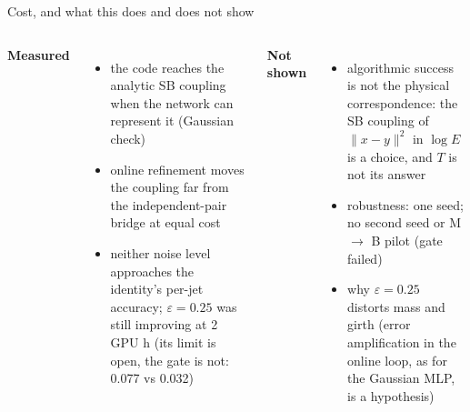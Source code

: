 \begin{frame}{Cost, and what this does and does not show}
\vspace{-0.6em}
\begin{center}

\end{center}
\vspace{-0.5em}

\vspace{0.1em}
\scriptsize
\begin{columns}[T]
\textbf{Measured}
\begin{itemize}\setlength\itemsep{0.0em}
\item the code reaches the analytic SB coupling when the network can represent it (Gaussian check)
\item online refinement moves the coupling far from the independent-pair bridge at equal cost
\item neither noise level approaches the identity's per-jet accuracy; $\varepsilon = 0.25$ was still improving
  at 2 GPU h (its limit is open, the gate is not: 0.077 vs 0.032)
\end{itemize}
\textbf{Not shown}
\begin{itemize}\setlength\itemsep{0.0em}
\item algorithmic success is not the physical correspondence: the SB coupling of $\|x - y\|^2$ in
  $\log E$ is a choice, and $T$ is not its answer
\item robustness: one seed; no second seed or M $\to$ B pilot (gate failed)
\item why $\varepsilon = 0.25$ distorts mass and girth (error amplification in the online loop, as for
  the Gaussian MLP, is a hypothesis)
\end{itemize}
\end{columns}
\end{frame}
